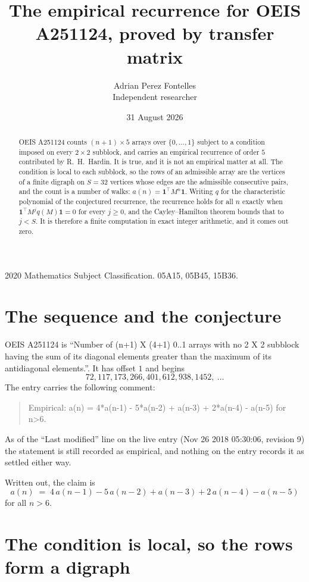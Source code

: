 \documentclass[11pt,a4paper]{article}
\title{The empirical recurrence for OEIS A251124, proved by transfer matrix}
\author{Adrian Perez Fontelles\\ \small Independent researcher}
\date{31 August 2026}
\theoremstyle{plain}
\theoremstyle{definition}
\begin{document}
\maketitle

\begin{abstract}
OEIS A251124 counts $(n+1)\times5$ arrays over $\{0,\dots,1\}$ subject to a condition imposed on
every $2\times2$ subblock, and carries an empirical recurrence of order $5$ contributed
by R.~H.~Hardin. It is true, and it is not an empirical matter at all. The condition is local
to each subblock, so the rows of an admissible array are the vertices of a finite digraph
on $S=32$ vertices whose edges are the admissible consecutive pairs, and the count is a
number of walks: $a(n)=\mathbf{1}^{\!\top}M^{n}\mathbf{1}$. Writing $q$
for the characteristic polynomial of the conjectured recurrence, the recurrence holds for all
$n$ exactly when $\mathbf{1}^{\!\top}M^{j}q(M)\mathbf{1}=0$ for every $j\ge0$, and the
Cayley--Hamilton theorem bounds that to $j<S$. It is therefore a finite computation in exact
integer arithmetic, and it comes out zero.
\end{abstract}

\noindent\small 2020 Mathematics Subject Classification. 05A15, 05B45, 15B36.\normalsize

\section{The sequence and the conjecture}

OEIS A251124 is ``Number of (n+1) X (4+1) 0..1 arrays with no 2 X 2 subblock having the sum of its diagonal elements greater than the maximum of its antidiagonal elements.''. It has offset $1$ and begins
\[
72, 117, 173, 266, 401, 612, 938, 1452,\ \dots
\]
The entry carries the following comment:
\begin{quote}\small
Empirical: a(n) = 4*a(n-1) - 5*a(n-2) + a(n-3) + 2*a(n-4) - a(n-5) for n>6.
\end{quote}
As of the ``Last modified'' line on the live entry (Nov 26 2018 05:30:06, revision 9) the statement is
still recorded as empirical, and nothing on the entry records it as settled either way.

Written out, the claim is
\begin{equation}\label{eq:conj}
a(n)\;=\;4\,a(n-1) - 5\,a(n-2) + a(n-3) + 2\,a(n-4) - a(n-5)
\end{equation}
for all $n>6$.

\section{The condition is local, so the rows form a digraph}
\end{document}
